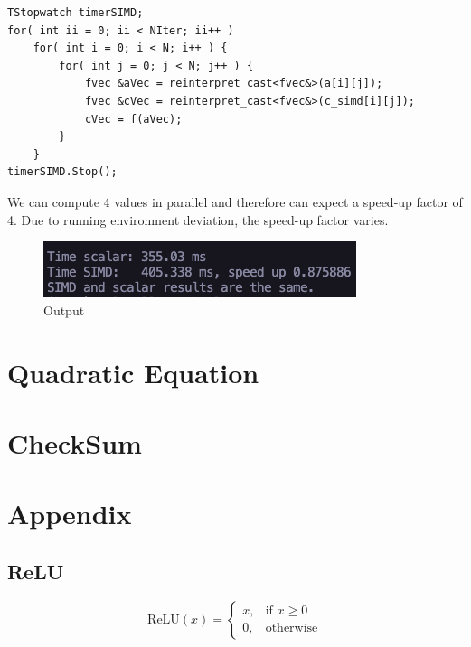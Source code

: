 \documentclass{article}
\begin{document}
\begin{lstlisting}[caption=Matrix.cpp]
TStopwatch timerSIMD;
for( int ii = 0; ii < NIter; ii++ )
    for( int i = 0; i < N; i++ ) {
        for( int j = 0; j < N; j++ ) {
            fvec &aVec = reinterpret_cast<fvec&>(a[i][j]);
            fvec &cVec = reinterpret_cast<fvec&>(c_simd[i][j]);
            cVec = f(aVec);
        }
    }
timerSIMD.Stop();
\end{lstlisting}

\noindent We can compute 4 values in parallel and therefore can expect a speed-up factor of 4. Due to running environment deviation, the speed-up factor varies.
\begin{figure}[H]
    \centering
    \includegraphics[scale=0.5]{matrix-output.png} 
    \caption{Output}
    \label{fig:example}
  \end{figure}
\section{Quadratic Equation}
\section{CheckSum}

\section{Appendix}
\subsection{ReLU}\label{subsec:ReLU}
\begin{center}
    \end{center}
    \[
    \text{ReLU}(x) =
    \begin{cases}
    x, & \text{if } x \geq 0 \\
    0, & \text{otherwise}
    \end{cases}
    \]
\end{document}
